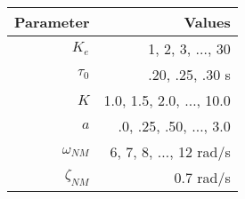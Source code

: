 \begin{tabular}{*{2}{r}}
    \toprule
    Parameter     & Values                        \\
    \midrule
    $K_e$         & 1, 2, 3, $\ldots$, 30         \\
    $\tau_0$      & .20, .25, .30 s               \\
    $K$           & 1.0, 1.5, 2.0, $\ldots$, 10.0 \\
    $a$           & .0, .25, .50, $\ldots$, 3.0   \\
    $\omega_{NM}$ & 6, 7, 8, $\ldots$, 12 rad/s     \\
    $\zeta_{NM}$  & 0.7 rad/s                     \\
    \bottomrule
\end{tabular}
